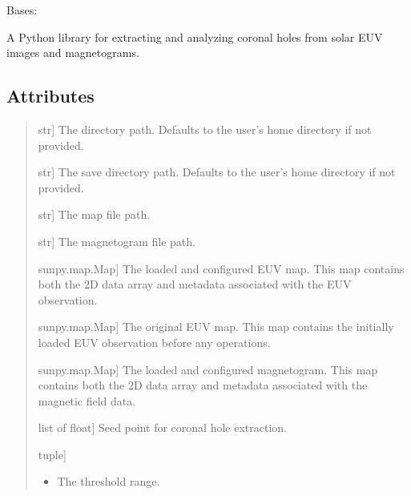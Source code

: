 \documentclass[letterpaper,10pt,english]{sphinxmanual}
\begin{document}
\begin{fulllineitems}
\label{\detokenize{pycatch/pycatch:pycatch.pycatch.pycatch}}
\pysigstartsignatures
{}
\pysigstopsignatures
\sphinxAtStartPar
Bases: 

\sphinxAtStartPar
A Python library for extracting and analyzing coronal holes from solar EUV images and magnetograms.


\subsection{Attributes}
\label{\detokenize{pycatch/pycatch:attributes}}\begin{quote}
\begin{description}
\sphinxlineitem{dir}{[}str{]}
\sphinxAtStartPar
The directory path. Defaults to the user’s home directory if not provided.

\sphinxlineitem{save\_dir}{[}str{]}
\sphinxAtStartPar
The save directory path. Defaults to the user’s home directory if not provided.

\sphinxlineitem{map\_file}{[}str{]}
\sphinxAtStartPar
The map file path.

\sphinxlineitem{magnetogram\_file}{[}str{]}
\sphinxAtStartPar
The magnetogram file path.

\sphinxlineitem{map}{[}sunpy.map.Map{]}
\sphinxAtStartPar
The loaded and configured EUV map.
This map contains both the 2D data array and metadata associated with the EUV observation.

\sphinxlineitem{original\_map}{[}sunpy.map.Map{]}
\sphinxAtStartPar
The original EUV map.
This map contains the initially loaded EUV observation before any operations.

\sphinxlineitem{magnetogram}{[}sunpy.map.Map{]}
\sphinxAtStartPar
The loaded and configured magnetogram.
This map contains both the 2D data array and metadata associated with the magnetic field data.

\sphinxlineitem{point}{[}list of float{]}
\sphinxAtStartPar
Seed point for coronal hole extraction.

\sphinxlineitem{curves}{[}tuple{]}\begin{itemize}
\item {} 
\sphinxAtStartPar
The threshold range.


\end{itemize}
\end{description}
\end{quote}
\end{fulllineitems}
\end{document}
